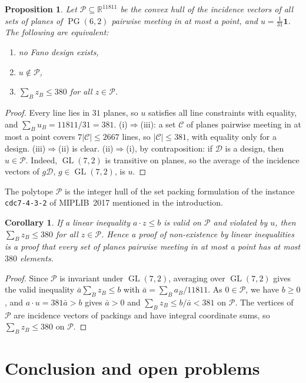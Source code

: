\documentclass[11pt]{amsart}
\newtheorem{proposition}[theorem]{Proposition}
\newtheorem{corollary}[theorem]{Corollary}
\theoremstyle{definition}
\newcommand{\D}{\mathcal{D}}
\newcommand{\PG}{\operatorname{PG}}
\newcommand{\GL}{\operatorname{GL}}
\begin{document}
\begin{proposition}\label{prop:lp}
Let $\mathcal P\subseteq\mathbb R^{11811}$ be the convex hull of the incidence vectors of all sets of planes of $\PG(6,2)$ pairwise meeting in at most a point, and $u=\frac1{31}\mathbf1$. The following are equivalent:
\begin{enumerate}[label=(\roman*)]
\item no Fano design exists,
\item $u\notin\mathcal P$,
\item $\sum_Bz_B\le380$ for all $z\in\mathcal P$.
\end{enumerate}
\end{proposition}
\begin{proof}
Every line lies in $31$ planes, so $u$ satisfies all line constraints with equality, and $\sum_Bu_B=11811/31=381$. (i)$\Rightarrow$(iii): a set $\mathcal C$ of planes pairwise meeting in at most a point covers $7|\mathcal C|\le2667$ lines, so $|\mathcal C|\le381$, with equality only for a design. (iii)$\Rightarrow$(ii) is clear. (ii)$\Rightarrow$(i), by contraposition: if $\D$ is a design, then $u\in\mathcal P$. Indeed, $\GL(7,2)$ is transitive on planes, so the average of the incidence vectors of $g\D$, $g\in\GL(7,2)$, is $u$.
\end{proof}

The polytope $\mathcal P$ is the integer hull of the set packing formulation of the instance \texttt{cdc7-4-3-2} of MIPLIB~2017 \cite{GHG+21} mentioned in the introduction.

\begin{corollary}
If a linear inequality $a\cdot z\le b$ is valid on $\mathcal P$ and violated by $u$, then $\sum_Bz_B\le380$ for all $z\in\mathcal P$. Hence a proof of non-existence by linear inequalities is a proof that every set of planes pairwise meeting in at most a point has at most $380$ elements.
\end{corollary}
\begin{proof}
Since $\mathcal P$ is invariant under $\GL(7,2)$, averaging over $\GL(7,2)$ gives the valid inequality $\bar a\sum_Bz_B\le b$ with $\bar a=\sum_Ba_B/11811$. As $0\in\mathcal P$, we have $b\ge0$, and $a\cdot u=381\bar a>b$ gives $\bar a>0$ and $\sum_Bz_B\le b/\bar a<381$ on $\mathcal P$. The vertices of $\mathcal P$ are incidence vectors of packings and have integral coordinate sums, so $\sum_Bz_B\le380$ on $\mathcal P$.
\end{proof}

\section{Conclusion and open problems}\label{sec:open}
\end{document}

